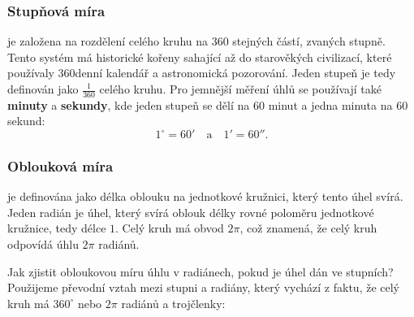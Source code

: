 \documentclass[12pt,a4paper]{article}
\begin{document}
\subsubsection*{Stupňová míra}
 je založena na rozdělení celého kruhu na $360$ stejných částí, zvaných stupně.
Tento systém má historické kořeny sahající až do starověkých civilizací, které používaly
360denní kalendář a astronomická pozorování. Jeden stupeň je tedy definován jako $\frac{1}{360}$ celého kruhu.
Pro jemnější měření úhlů se používají také \textbf{minuty} a \textbf{sekundy}, kde jeden stupeň se dělí na
$60$ minut a jedna minuta na $60$ sekund:
\[1^\circ = 60' \quad\text{a}\quad 1' = 60''.\]


\subsubsection*{Oblouková míra}
 je definována jako délka oblouku na jednotkové kružnici, který tento úhel svírá.
Jeden radián je úhel, který svírá oblouk délky rovné poloměru jednotkové kružnice, tedy délce $1$.
Celý kruh má obvod $2\pi$, což znamená, že celý kruh odpovídá úhlu $2\pi$ radiánů.

\begin{center}
\end{center}

Jak zjistit obloukovou míru úhlu v radiánech, pokud je úhel dán ve stupních?
Použijeme převodní vztah mezi stupni a radiány, který vychází z faktu, že celý kruh má $360^\circ$ nebo $2\pi$ radiánů a trojčlenky:
\end{document}

